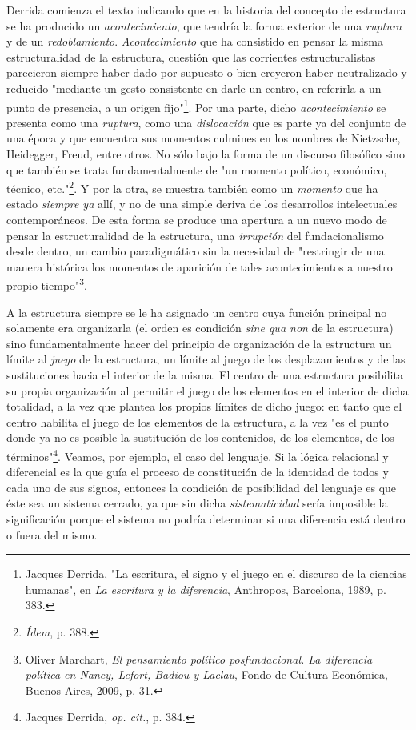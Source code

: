 \documentclass{book}
\begin{document}
Derrida comienza el texto indicando que en la historia del concepto de
estructura se ha producido un \emph{acontecimiento}, que tendría la
forma exterior de una \emph{ruptura} y de un \emph{redoblamiento}.
\emph{Acontecimiento} que ha consistido en pensar la misma
estructuralidad de la estructura, cuestión que las corrientes
estructuralistas parecieron siempre haber dado por supuesto o bien
creyeron haber neutralizado y reducido "mediante un gesto consistente en
darle un centro, en referirla a un punto de presencia, a un origen
fijo"\footnote{Jacques Derrida, "La escritura, el signo y el juego en el
  discurso de la ciencias humanas", en \emph{La escritura y la
  diferencia}, Anthropos, Barcelona, 1989, p. 383.}. Por una parte,
dicho \emph{acontecimiento} se presenta como una \emph{ruptura}, como
una \emph{dislocación} que es parte ya del conjunto de una época y que
encuentra sus momentos culmines en los nombres de Nietzsche, Heidegger,
Freud, entre otros. No sólo bajo la forma de un discurso filosófico sino
que también se trata fundamentalmente de "un momento político,
económico, técnico, etc."\footnote{\emph{Ídem}, p. 388.}. Y por la otra,
se muestra también como un \emph{momento} que ha estado \emph{siempre
ya} allí, y no de una simple deriva de los desarrollos intelectuales
contemporáneos. De esta forma se produce una apertura a un nuevo modo de
pensar la estructuralidad de la estructura, una \emph{irrupción} del
fundacionalismo desde dentro, un cambio paradigmático sin la necesidad
de "restringir de una manera histórica los momentos de aparición de
tales acontecimientos a nuestro propio tiempo"\footnote{Oliver Marchart,
  \emph{El pensamiento político posfundacional. La diferencia política
  en Nancy, Lefort, Badiou y Laclau}, Fondo de Cultura Económica, Buenos
  Aires, 2009, p. 31.}.

A la estructura siempre se le ha asignado un centro cuya función
principal no solamente era organizarla (el orden es condición \emph{sine
qua non} de la estructura) sino fundamentalmente hacer del principio de
organización de la estructura un límite al \emph{juego} de la
estructura, un límite al juego de los desplazamientos y de las
sustituciones hacia el interior de la misma. El centro de una estructura
posibilita su propia organización al permitir el juego de los elementos
en el interior de dicha totalidad, a la vez que plantea los propios
límites de dicho juego: en tanto que el centro habilita el juego de los
elementos de la estructura, a la vez "es el punto donde ya no es posible
la sustitución de los contenidos, de los elementos, de los
términos"\footnote{Jacques Derrida, \emph{op. cit.}, p. 384.}. Veamos,
por ejemplo, el caso del lenguaje. Si la lógica relacional y diferencial
es la que guía el proceso de constitución de la identidad de todos y
cada uno de sus signos, entonces la condición de posibilidad del
lenguaje es que éste sea un sistema cerrado, ya que sin dicha
\emph{sistematicidad} sería imposible la significación porque el sistema
no podría determinar si una diferencia está dentro o fuera del mismo.
\end{document}

